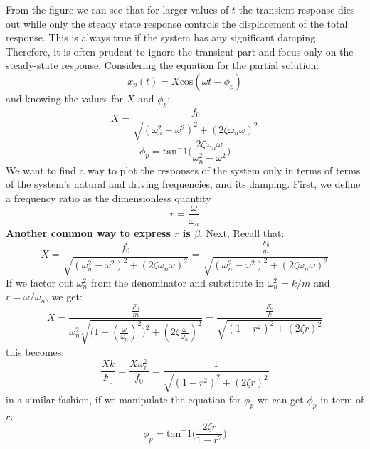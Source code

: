 \documentclass[12pt,letter]{article}
\numberwithin{ex}{section} %
\begin{document}
			From the figure we can see that for larger values of $t$ the transient response dies out while only the steady state response controls the displacement of the total response. This is always true if the system has any significant damping. Therefore, it is often prudent to ignore the transient part and focus only on the steady-state response. Considering the equation for the partial solution: 
			\begin{equation}
				x_p(t) = X \text{cos}(\omega t - \phi_p)
			\end{equation}			 
			and knowing the values for $X$ and $\phi_p$: 
			\begin{equation}
				X = \frac{f_0}{\sqrt{(\omega_n^2 - \omega^2)^2 +  (2\zeta \omega_n \omega)^2}} 
			\end{equation}	
			\begin{equation}
				\phi_p = \text{tan}^-1\bigg(\frac{2\zeta \omega_n \omega}{\omega_n^2 - \omega^2}\bigg)
			\end{equation}	
			We want to find a way to plot the responses of the system only in terms of terms of the system's natural and driving frequencies, and its damping. First, we define a frequency ratio as the dimensionless quantity 
			\begin{equation}
				r = \frac{\omega}{\omega_n}
			\end{equation}
			\textbf{Another common way to express $r$ is $\beta$}. Next, Recall that:
			\begin{equation}
				X = \frac{f_0}{\sqrt{(\omega_n^2 - \omega^2)^2 +  (2\zeta \omega_n \omega)^2}}  = \frac{\frac{F_0}{m}}{\sqrt{(\omega_n^2 - \omega^2)^2 +  (2\zeta \omega_n \omega)^2}} 
			\end{equation}				
			If we factor out $\omega_n^2$ from the denominator and substitute in $\omega_n^2 = k/m$ and $r = \omega/\omega_n$, we get:
			\begin{equation}
				X = \frac{\frac{F_0}{m}}{\omega_n^2 \sqrt{\big(1 - (\frac{\omega}{\omega_n})^2\big)^2 +  (2\zeta \frac{\omega}{\omega_n})^2}} =  \frac{\frac{F_0}{k}}{\sqrt{(1-r^2)^2+(2\zeta r)^2}}
			\end{equation}				
			this becomes:
			\begin{equation}
				\frac{Xk}{F_0} = \frac{X \omega_n^2}{f_0} = \frac{1}{\sqrt{(1-r^2)^2+(2\zeta r)^2}}
			\end{equation}				
			in a similar fashion, if we manipulate the equation for $\phi_p$ we can get $\phi_p$ in term of $r$:
			\begin{equation}
				\phi_p = \text{tan}^-1\bigg(\frac{2 \zeta r}{1-r^2}\bigg)
			\end{equation}	
\end{document}
